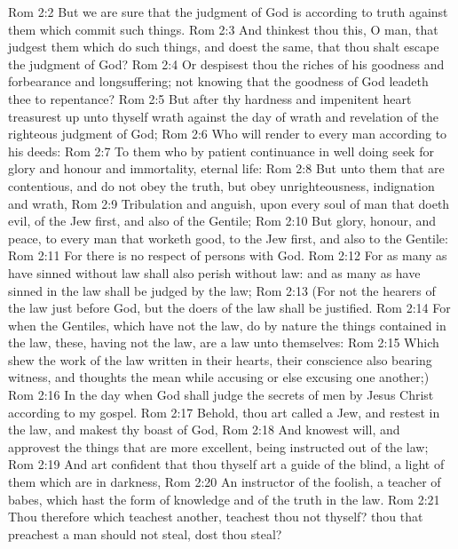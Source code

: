 \vs Rom 2:2 But we are sure that the judgment of God is according to truth against them which commit such things.
\vs Rom 2:3 And thinkest thou this, O man, that judgest them which do such things, and doest the same, that thou shalt escape the judgment of God?
\vs Rom 2:4 Or despisest thou the riches of his goodness and forbearance and longsuffering; not knowing that the goodness of God leadeth thee to repentance?
\vs Rom 2:5 But after thy hardness and impenitent heart treasurest up unto thyself wrath against the day of wrath and revelation of the righteous judgment of God;
\vs Rom 2:6 Who will render to every man according to his deeds:
\vs Rom 2:7 To them who by patient continuance in well doing seek for glory and honour and immortality, eternal life:
\vs Rom 2:8 But unto them that are contentious, and do not obey the truth, but obey unrighteousness, indignation and wrath,
\vs Rom 2:9 Tribulation and anguish, upon every soul of man that doeth evil, of the Jew first, and also of the Gentile;
\vs Rom 2:10 But glory, honour, and peace, to every man that worketh good, to the Jew first, and also to the Gentile:
\vs Rom 2:11 For there is no respect of persons with God.
\vs Rom 2:12 For as many as have sinned without law shall also perish without law: and as many as have sinned in the law shall be judged by the law;
\vs Rom 2:13 (For not the hearers of the law  just before God, but the doers of the law shall be justified.
\vs Rom 2:14 For when the Gentiles, which have not the law, do by nature the things contained in the law, these, having not the law, are a law unto themselves:
\vs Rom 2:15 Which shew the work of the law written in their hearts, their conscience also bearing witness, and  thoughts the mean while accusing or else excusing one another;)
\vs Rom 2:16 In the day when God shall judge the secrets of men by Jesus Christ according to my gospel.
\vs Rom 2:17 Behold, thou art called a Jew, and restest in the law, and makest thy boast of God,
\vs Rom 2:18 And knowest  will, and approvest the things that are more excellent, being instructed out of the law;
\vs Rom 2:19 And art confident that thou thyself art a guide of the blind, a light of them which are in darkness,
\vs Rom 2:20 An instructor of the foolish, a teacher of babes, which hast the form of knowledge and of the truth in the law.
\vs Rom 2:21 Thou therefore which teachest another, teachest thou not thyself? thou that preachest a man should not steal, dost thou steal?
